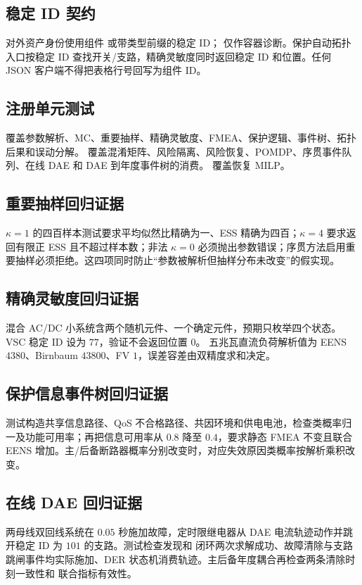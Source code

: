 \subsection{稳定 ID 契约}
对外资产身份使用组件  或带类型前缀的稳定 ID； 仅作容器诊断。保护自动拓扑入口按稳定
ID 查找开关/支路，精确灵敏度同时返回稳定 ID 和位置。任何 JSON 客户端不得把表格行号回写为组件 ID。

\subsection{注册单元测试}
 覆盖参数解析、MC、重要抽样、精确灵敏度、FMEA、保护逻辑、事件树、拓扑后果和误动分解。
 覆盖混淆矩阵、风险隔离、风险恢复、POMDP、序贯事件队列、在线 DAE 和
DAE 到年度事件树的消费。 覆盖恢复 MILP。

\subsection{重要抽样回归证据}
$\kappa=1$ 的四百样本测试要求平均似然比精确为一、ESS 精确为四百；$\kappa=4$ 要求返回有限正 ESS 且不超过样本数；非法
$\kappa=0$ 必须抛出参数错误；序贯方法启用重要抽样必须拒绝。这四项同时防止“参数被解析但抽样分布未改变”的假实现。

\subsection{精确灵敏度回归证据}
混合 AC/DC 小系统含两个随机元件、一个确定元件，预期只枚举四个状态。VSC 稳定 ID 设为 $77$，验证不会返回位置 $0$。
五兆瓦直流负荷解析值为 EENS $4380$、Birnbaum $43800$、FV $1$，误差容差由双精度求和决定。

\subsection{保护信息事件树回归证据}
测试构造共享信息路径、QoS 不合格路径、共因环境和供电电池，检查类概率归一及功能可用率；再把信息可用率从 $0.8$ 降至
$0.4$，要求静态 FMEA 不变且联合 EENS 增加。主/后备断路器概率分别改变时，对应失效原因类概率按解析乘积改变。

\subsection{在线 DAE 回归证据}
两母线双回线系统在 $0.05$ 秒施加故障，定时限继电器从 DAE 电流轨迹动作并跳开稳定 ID 为 $101$ 的支路。测试检查发现和
闭环两次求解成功、故障清除与支路跳闸事件均实际施加、DER 状态机消费轨迹。主后备年度耦合再检查两条清除时刻一致性和
联合指标有效性。


